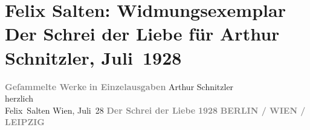 

         
         \renewcommand{\erwaehntePersonen}{Personen: Felix Salten}
         \renewcommand{\erwaehnteInstitutionen}{Institutionen: Paul Zsolnay Verlag}
         \renewcommand{\erwaehnteOrte}{Orte: Berlin, Leipzig, Wien}
         \renewcommand{\erwaehnteWerke}{Werke: Der Schrei der Liebe. Novellen}
               \section[Felix Salten: Widmungsexemplar Der Schrei der Liebe für Arthur Schnitzler, Juli 1928]{ Felix Salten: Widmungsexemplar Der Schrei der Liebe für Arthur
               Schnitzler, Juli 1928}\nopagebreak{}\rehead{ }\begin{ledgroupsized}[t]{13cm}\normalsize\beginnumbering{} \toendnotes[C]{\smallbreak\pagebreak[2]} 
\pstart
           \noindent{}\centering{}{\pb}\textcolor{gray}{\textbf{\textsc{}}}\pend
           \pstart
           \noindent{}\centering{}\textcolor{gray}{\textbf{Geſammelte Werke}}\pend
           \pstart
           \noindent{}\centering{}\textcolor{gray}{\textbf{in Einzelausgaben}}\pend
           \pstart
           \noindent{}Arthur Schnitzler {\\}herzlich {\\}\spacefill\mbox{Felix Salten}\pend
           \pstart
           Wien, Juli 28\pend
           {\bigskip}\pstart
           \noindent{}\centering{}{\pb}\textcolor{gray}{\textbf{\textsc{}}}\pend
           \pstart
           \noindent{}\centering{}\textcolor{gray}{\textbf{Der Schrei der Liebe}}\pend
           \pstart
           \noindent{}\centering{}\textcolor{gray}{\textbf{\textsc{}}}\pend
           {\bigskip}\pstart
           \noindent{}\centering{}\textcolor{gray}{\textbf{\textsc{1928}}}\pend
           \pstart
           \noindent{}\centering{}\textcolor{gray}{\textbf{\textsc{}}}\pend
           \pstart
           \noindent{}\centering{}\textcolor{gray}{\textbf{\textsc{BERLIN / WIEN / LEIPZIG}}}\pend
           
         
         \endnumbering{}\end{ledgroupsized}  \newcommand{\dateiname}{L03044}\newcommand{\titel}{Felix Salten: Widmungsexemplar Der Schrei der Liebe für Arthur Schnitzler, Juli 1928}\newcommand{\editorInnen}{Martin Anton Müller und Laura Untner}
      